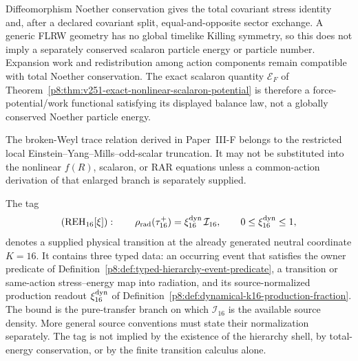 \documentclass[12pt,a4paper]{article}
\begin{document}
\begin{remark}
\label{p8:rem:v176-no-scalaron-noether-energy}
Diffeomorphism Noether conservation gives the total covariant stress identity
and, after a declared covariant split, equal-and-opposite sector exchange.  A
generic FLRW geometry has no global timelike Killing symmetry, so this does
not imply a separately conserved scalaron particle energy or particle number.
Expansion work and redistribution among action components remain compatible
with total Noether conservation.  The exact scalaron quantity
\(\mathcal E_F\) of
Theorem~\ref{p8:thm:v251-exact-nonlinear-scalaron-potential} is therefore a
force-potential/work functional satisfying its displayed balance law, not a
globally conserved Noether particle energy.
\end{remark}

\begin{remark}
\label{p8:rem:v176-local-trace-fR-firewall}
The broken-Weyl trace relation derived in Paper~III-F belongs to the restricted
local Einstein--Yang--Mills--odd-scalar truncation.  It may not be substituted
into the nonlinear \(f(R)\), scalaron, or RAR equations unless a common-action
derivation of that enlarged branch is separately supplied.
\end{remark}


\begin{definition}[Direct \(K=16\) radiation-transfer interface]
\label{p8:def:direct-k16-radiation-transfer-interface}
The tag
\begin{equation}
\label{p8:eq:direct-k16-radiation-transfer-interface}
 (\mathrm{REH}_{16}[\xi]):\qquad
 \rho_{\rm rad}(\tau_{16}^{+})
 =\xi_{16}^{\rm dyn}\,\mathcal I_{16},
 \qquad 0\leq\xi_{16}^{\rm dyn}\leq1,
\end{equation}
denotes a supplied physical transition at the already generated neutral
coordinate \(K=16\).  It contains three typed data: an occurring event that
satisfies the owner predicate of
Definition~\ref{p8:def:typed-hierarchy-event-predicate}, a transition or
same-action stress--energy map into radiation, and its source-normalized
production readout \(\xi_{16}^{\rm dyn}\) of
Definition~\ref{p8:def:dynamical-k16-production-fraction}.  The bound is the pure-transfer branch on
which \(\mathcal I_{16}\) is the available source density.  More general
source conventions must state their normalization separately.  The tag is
not implied by the existence of the hierarchy shell, by total-energy
conservation, or by the finite transition calculus alone.
\end{definition}
\end{document}
